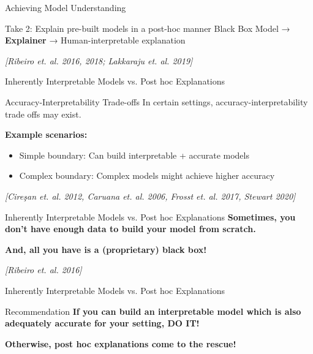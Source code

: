 \documentclass[10pt,aspectratio=169]{beamer}
\begin{document}
\begin{frame}{Achieving Model Understanding}
\begin{block}{Take 2: Explain pre-built models in a post-hoc manner}
\centering
Black Box Model → \textbf{Explainer} → Human-interpretable explanation

\vspace{0.5cm}
\textit{[Ribeiro et. al. 2016, 2018; Lakkaraju et. al. 2019]}
\end{block}
\end{frame}

\begin{frame}{Inherently Interpretable Models vs. Post hoc Explanations}
\begin{block}{Accuracy-Interpretability Trade-offs}
In certain settings, accuracy-interpretability trade offs may exist.

\textbf{Example scenarios:}
\begin{itemize}
\item Simple boundary: Can build interpretable + accurate models
\item Complex boundary: Complex models might achieve higher accuracy
\end{itemize}

\vspace{0.3cm}
\textit{[Cireşan et. al. 2012, Caruana et. al. 2006, Frosst et. al. 2017, Stewart 2020]}
\end{block}
\end{frame}

\begin{frame}{Inherently Interpretable Models vs. Post hoc Explanations}
\centering
\textbf{Sometimes, you don't have enough data to build your model from scratch.}

\vspace{0.5cm}
\textbf{And, all you have is a (proprietary) black box!}

\vspace{0.5cm}
\textit{[Ribeiro et. al. 2016]}
\end{frame}

\begin{frame}{Inherently Interpretable Models vs. Post hoc Explanations}
\begin{block}{Recommendation}
\textbf{If you can build an interpretable model which is also adequately accurate for your setting, DO IT!}

\vspace{0.5cm}
\textbf{Otherwise, post hoc explanations come to the rescue!}
\end{block}
\end{frame}
\end{document}
